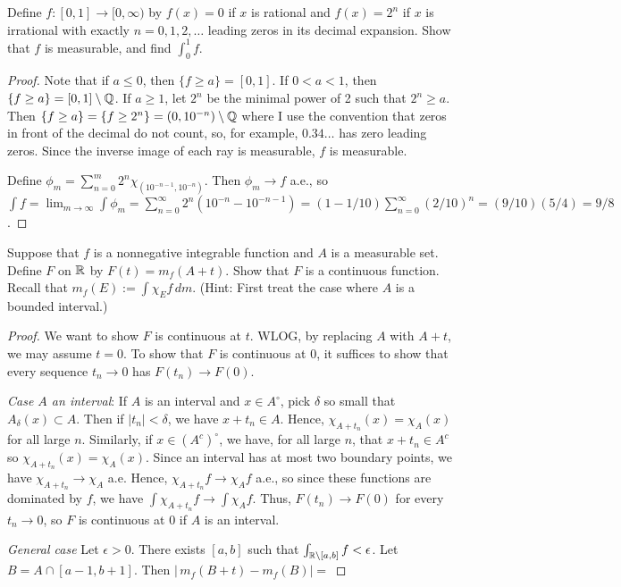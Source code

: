 \documentclass{article}
\newcommand{\dm}{\,dm}
\newcommand{\m}{\,m}
\begin{document}
 Define $f: [0,1] \to [0, \infty)$ by $f(x) = 0$ if $x$ is rational and $f(x) = 2^n$ if $x$ is irrational with exactly $n = 0,1,2,\ldots$ leading zeros in its decimal expansion. Show that $f$ is measurable, and find $\int_0^1 f$.
\begin{proof}
Note that if $a \le 0$, then $\{f \ge a\} = [0,1]$. If $0 < a < 1$, then $\{f \ge a\} = [0,1]\setminus \mathbb{Q}$.
If $a\ge 1$, let $2^n$ be the minimal power of 2 such that $2^n \ge a$. Then $\{f \ge a\} = \{f \ge 2^n\} = (0, 10^{-n}) \setminus \mathbb{Q}$ where I use the convention that zeros in front of the decimal do not count, so, for example, $0.34\ldots$ has zero leading zeros. Since the inverse image of each ray is measurable, $f$ is measurable.

Define $\phi_m = \sum_{n=0}^m 2^n \chi_{(10^{-n-1}, 10^{-n})}$. Then $\phi_m \to f$ a.e., so $\int f = \lim_{m\to\infty} \int \phi_m = \sum_{n=0}^\infty 2^n (10^{-n} - 10^{-n-1})
 = (1 - 1/10) \sum_{n=0}^\infty (2/10)^n = (9/10)(5/4) = 9/8$.

\end{proof}
 Suppose that $f$ is a nonnegative integrable function and $A$ is a measurable set. Define $F$ on $\mathbb{R}$ by $F(t) = m_f(A+t)$. Show that $F$ is a continuous function. Recall that $m_f(E) := \int \chi_E f \dm$. (Hint: First treat the case where $A$ is a bounded interval.)
\begin{proof}
We want to show $F$ is continuous at $t$.  WLOG, by replacing $A$ with $A+t$, we may assume $t=0$. To show that $F$ is continuous at $0$, it suffices to show that every sequence $t_n \to 0$ has $F(t_n) \to F(0)$.  

\emph{Case $A$ an interval}: If $A$ is an interval and $x \in A^\circ$, pick $\delta$ so small that $A_{\delta}(x) \subset A$. Then if $|t_n| < \delta$, we have $x+t_n \in A$. Hence, $\chi_{A+t_n}(x) = \chi_{A}(x)$ for all large $n$.  Similarly, if $x \in (A^c)^\circ$, we have, for all large $n$, that $x+t_n \in A^c$ so $\chi_{A+t_n}(x) = \chi_{A}(x)$.  Since an interval has at most two boundary points, we have $\chi_{A+t_n} \to \chi_{A}$ a.e.  Hence, $\chi_{A+t_n} f \to \chi_{A} f$ a.e., so since these functions are dominated by $f$, we have $\int \chi_{A+t_n} f \to \int \chi_{A} f$. Thus, $F(t_n) \to F(0)$ for every $t_n \to 0$, so $F$ is continuous at $0$ if $A$ is an interval.

\emph{General case} Let $\epsilon > 0$. There exists $[a,b]$ such that $\int_{\mathbb{R}\setminus [a,b]} f < \epsilon$. Let $B = A \cap [a-1,b+1]$. Then 
$|\m_f(B + t) - m_f(B)| = $

\end{proof}
\end{document}
